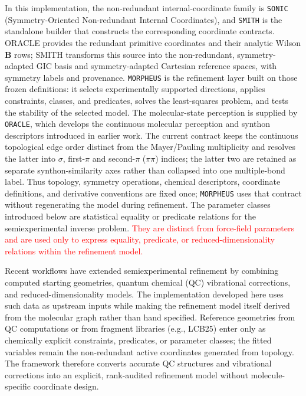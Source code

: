 \documentclass[aip,jcp,reprint,longbibliography,floatfix]{revtex4-2}
\newcommand{\rev}[1]{\textcolor{red}{#1}}
\begin{document}
In this implementation, the non-redundant internal-coordinate family is
\texttt{SONIC} (Symmetry-Oriented Non-redundant Internal Coordinates), and
\texttt{SMITH} is the standalone builder that constructs the corresponding
coordinate contracts. ORACLE provides the redundant primitive coordinates and
their analytic Wilson $\mathbf{B}$ rows; SMITH transforms this source into the
non-redundant, symmetry-adapted GIC basis and symmetry-adapted Cartesian
reference spaces, with symmetry labels and provenance. \texttt{MORPHEUS} is the refinement layer built on those
frozen definitions: it selects experimentally supported directions, applies
constraints, classes, and predicates, solves the least-squares problem, and
tests the stability of the selected model. The molecular-state perception is
supplied by \texttt{ORACLE}, which develops the continuous molecular perception
and synthon descriptors introduced in earlier work.\cite{Lazzari2020Proxima,Lazzari2024SynthonPCS}
The current contract keeps the continuous topological edge order distinct from
the Mayer/Pauling multiplicity and resolves the latter into $\sigma$,
first-$\pi$ and second-$\pi$ ($\pi\pi$) indices; the latter two are retained
as separate synthon-similarity axes rather than collapsed into one
multiple-bond label.
Thus topology, symmetry operations, chemical descriptors, coordinate
definitions, and derivative conventions are fixed once; \texttt{MORPHEUS} uses
that contract without regenerating the model during refinement.
The parameter classes introduced below are statistical equality or predicate
relations for the semiexperimental inverse problem. \rev{They are distinct from
force-field parameters and are used only to express equality, predicate, or
reduced-dimensionality relations within the refinement model.}

Recent workflows have extended semiexperimental refinement by combining
computed starting geometries, quantum chemical (QC) vibrational corrections, and
reduced-dimensionality models.\cite{Mendolicchio2025FastDvib} The implementation
developed here uses such data as upstream inputs while making the refinement
model itself derived from the molecular graph rather than hand specified.
Reference geometries from QC computations or from fragment libraries (e.g.,
LCB25\cite{Lazzari2025LCB25}) enter only as chemically explicit constraints,
predicates, or parameter classes; the fitted variables remain the
non-redundant active coordinates generated from topology. The framework
therefore converts accurate QC structures and vibrational corrections into an
explicit, rank-audited refinement model without molecule-specific coordinate
design.
\end{document}
